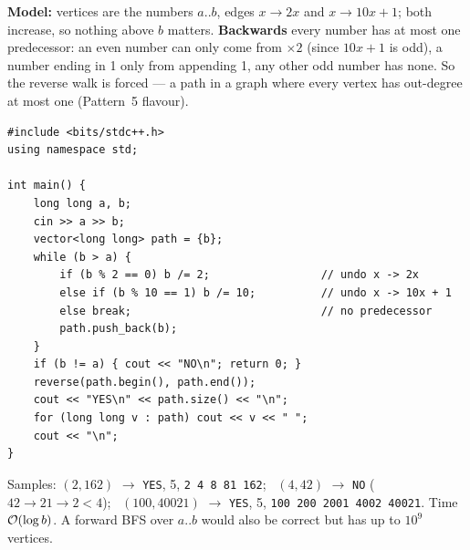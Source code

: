\begin{solutionbox}
\textbf{Model:} vertices are the numbers $a..b$, edges $x \to 2x$ and $x \to 10x+1$; both increase, so nothing above $b$ matters. \textbf{Backwards} every number has at most one predecessor: an even number can only come from $\times2$ (since $10x + 1$ is odd), a number ending in 1 only from appending 1, any other odd number has none. So the reverse walk is forced --- a path in a graph where every vertex has out-degree at most one (Pattern~5 flavour).
\begin{lstlisting}[style=cpp]
#include <bits/stdc++.h>
using namespace std;

int main() {
    long long a, b;
    cin >> a >> b;
    vector<long long> path = {b};
    while (b > a) {
        if (b % 2 == 0) b /= 2;                 // undo x -> 2x
        else if (b % 10 == 1) b /= 10;          // undo x -> 10x + 1
        else break;                             // no predecessor
        path.push_back(b);
    }
    if (b != a) { cout << "NO\n"; return 0; }
    reverse(path.begin(), path.end());
    cout << "YES\n" << path.size() << "\n";
    for (long long v : path) cout << v << " ";
    cout << "\n";
}
\end{lstlisting}
\begin{center}
\end{center}
Samples: $(2, 162)$ $\to$ \texttt{YES}, 5, \texttt{2 4 8 81 162}; \ $(4, 42)$ $\to$ \texttt{NO} ($42 \to 21 \to 2 < 4$); \ $(100, 40021)$ $\to$ \texttt{YES}, 5, \texttt{100 200 2001 4002 40021}. Time $\mathcal{O}(\log b)$. A forward BFS over $a..b$ would also be correct but has up to $10^9$ vertices.
\end{solutionbox}

